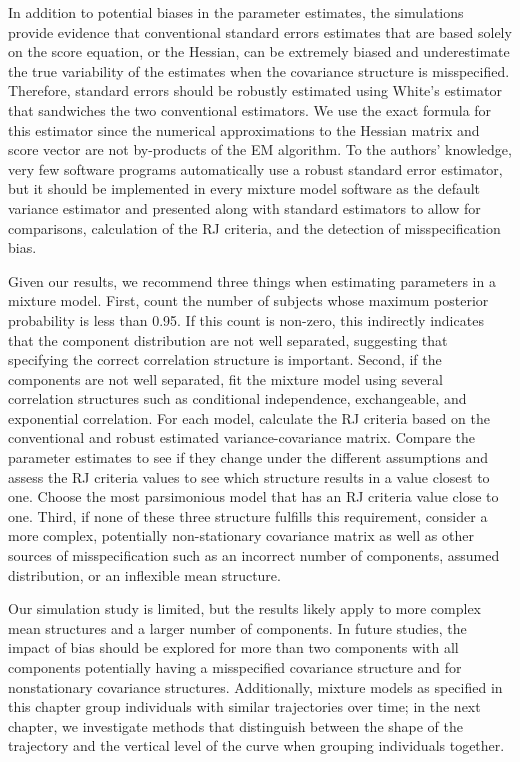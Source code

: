 In addition to potential biases in the parameter estimates, the simulations provide evidence that conventional standard errors estimates that are based solely on the score equation, or the Hessian, can be extremely biased and underestimate the true variability of the estimates when the covariance structure is misspecified. Therefore, standard errors should be robustly estimated using White's estimator that sandwiches the two conventional estimators. We use the exact formula for this estimator since the numerical approximations to the Hessian matrix and score vector are not by-products of the EM algorithm. To the authors' knowledge, very few software programs automatically use a robust standard error estimator, but it should be implemented in every mixture model software as the default variance estimator and presented along with standard estimators to allow for comparisons, calculation of the RJ criteria, and the detection of misspecification bias. 

Given our results, we recommend three things when estimating parameters in a mixture model. First, count the number of subjects whose maximum posterior probability is less than 0.95. If this count is non-zero, this indirectly indicates that the component distribution are not well separated, suggesting that specifying the correct correlation structure is important. Second, if the components are not well separated, fit the mixture model using several correlation structures such as conditional independence, exchangeable, and exponential correlation. For each model, calculate the RJ criteria based on the conventional and robust estimated variance-covariance matrix.  Compare the parameter estimates to see if they change under the different assumptions and assess the RJ criteria values to see which structure results in a value closest to one. Choose the most parsimonious model that has an RJ criteria value close to one.  Third, if none of these three structure fulfills this requirement, consider a more complex, potentially non-stationary covariance matrix as well as other sources of misspecification such as an incorrect number of components, assumed distribution, or an inflexible mean structure.

Our simulation study is limited, but the results likely apply to more complex mean structures and a larger number of components. In future studies, the impact of bias should be explored for more than two components with all components potentially having a misspecified covariance structure and for nonstationary covariance structures. Additionally, mixture models as specified in this chapter group individuals with similar trajectories over time; in the next chapter, we investigate methods that distinguish between the shape of the trajectory and the vertical level of the curve when grouping individuals together.




